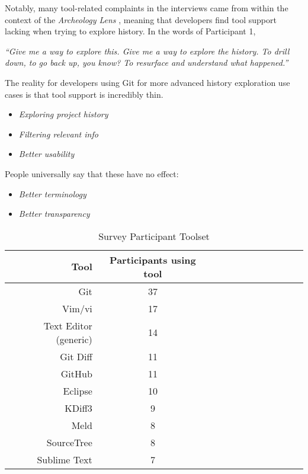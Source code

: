 
Notably, many tool-related complaints in the interviews came from within the context of the \textit{Archeology Lens} \cite{mihai_lenses}, meaning that developers find tool support lacking when trying to explore history. In the words of Participant 1, 

\begin{displayquote}
\textit{``Give me a way to explore this. Give me a way to explore the history. To drill down, to go back up, you know? To resurface and understand what happened.''}
\end{displayquote}

The reality for developers using Git for more advanced history exploration use cases is that tool support is incredibly thin.


\begin{itemize}
	\item \textit{Exploring project history}\\
	\item \textit{Filtering relevant info}\\
	\item \textit{Better usability}\\
\end{itemize}

People universally say that these have no effect:
\begin{itemize}
	\item \textit{Better terminology}\\
	\item \textit{Better transparency}\\
\end{itemize}

\begin{table}[!]
\renewcommand{\arraystretch}{1.3}
\caption{Survey Participant Toolset}
\label{survey_toolset}
\centering
\begin{tabularx}{0.45\textwidth}{@{}r|*{10}{C}c@{}}
\toprule
Tool & Participants using tool\\
\midrule
Git	& 37\\
Vim/vi & 17\\
Text Editor (generic) & 14\\
Git Diff & 11\\
GitHub & 11\\
Eclipse & 10\\
KDiff3 & 9\\
Meld & 8\\
SourceTree & 8\\
Sublime Text & 7\\
\bottomrule
\end{tabularx}
\end{table}

